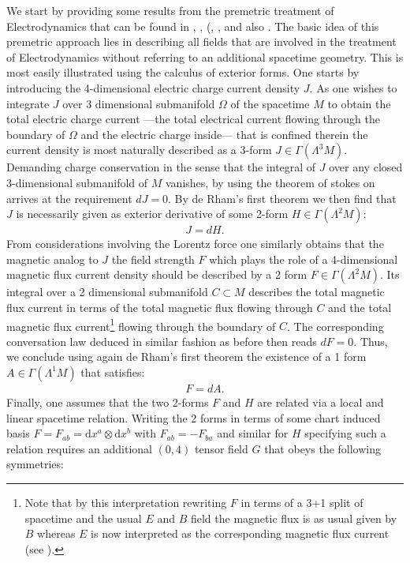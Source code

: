 We start by providing some results from the premetric treatment of Electrodynamics that can be found in \cite{1999PhLB..458..466O}, \cite{1999gr.qc....11096H}, (\cite{hehl2003foundations}, \cite{2006physics..10221H}, \cite{2004PhRvD..70j5022L} and also \cite{Hehl2005}. The basic idea of this premetric approach lies in describing all fields that are involved in the treatment of Electrodynamics without referring to an additional spacetime geometry. This is most easily illustrated using the calculus of exterior forms. One starts by introducing the 4-dimensional electric charge current density $J$. As one wishes to integrate $J$ over 3 dimensional submanifold $\Omega$ of the spacetime $M$ to obtain the total electric charge current ---the total electrical current flowing through the boundary of $\Omega$ and the electric charge inside--- that is confined therein the current density is most naturally described as a 3-form $J \in \Gamma(\Lambda^3M)$. Demanding charge conservation in the sense that the integral of $J$ over any closed 3-dimensional submanifold of $M$ vanishes, by using the theorem of stokes on arrives at the requirement $dJ =0$. By de Rham's first theorem we then find that $J$ is necessarily given as exterior derivative of some 2-form $H \in \Gamma(\Lambda^2M)$:
\begin{align}
    J = d H.
\end{align}
From considerations involving the Lorentz force one similarly obtains that the magnetic analog to $J$ the field strength $F$ which plays the role of a 4-dimensional magnetic flux current density should be described by a 2 form $F \in \Gamma(\Lambda^2M)$. Its integral over a 2 dimensional submanifold $C \subset M$ describes the total magnetic flux current in terms of the total magnetic flux flowing through $C$ and the total magnetic flux current\footnote{Note that by this interpretation rewriting $F$ in terms of a 3+1 split of spacetime and the usual $E$ and $B$ field the magnetic flux is as usual given by $B$ whereas $E$ is now interpreted as the corresponding magnetic flux current (see \cite{2006physics..10221H}).} flowing through the boundary of $C$. The corresponding conversation law deduced in similar fashion as before then reads $dF =0$. Thus, we conclude using again de Rham's first theorem the existence of a 1 form $A \in \Gamma(\Lambda^1M)$ that satisfies:
\begin{align}
    F = d A.
\end{align}
Finally, one assumes that the two 2-forms $F$ and $H$ are related via a local and linear spacetime relation. Writing the 2 forms in terms of some chart induced basis $F = F_{ab} = \mathrm{d}x^a \otimes \mathrm{d}x^b$ with $F_{ab} = - F_{ba}$ and similar for $H$ specifying such a relation requires an additional $(0,4)$ tensor field $G$ that obeys the following symmetries:

